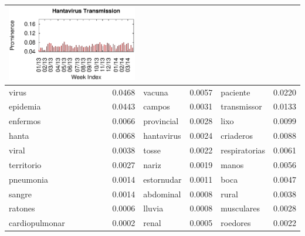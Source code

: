 \documentclass[conference]{IEEEtran}
\begin{document}
\begin{table}[t]
\begin{center}
\begin{tabular}{|lr|lr|lr|}
\multicolumn{2}{|c|}{\includegraphics[clip,scale=0.45]{fig/topic_hanta2_timeline.eps}} \\ \hline
virus & 0.0468 & vacuna & 0.0057 & paciente & 0.0220 \\
epidemia & 0.0443 & campos & 0.0031 & transmissor & 0.0133 \\
enfermos & 0.0066& provincial & 0.0028  & lixo &0.0099 \\
hanta & 0.0068 & hantavirus & 0.0024  & criaderos & 0.0088\\
viral & 0.0038 & tosse & 0.0022 & respiratorias & 0.0061 \\
territorio & 0.0027 & nariz & 0.0019 & manos & 0.0056 \\
pneumonia & 0.0014 & estornudar & 0.0011 & boca & 0.0047 \\
sangre & 0.0014 & abdominal & 0.0008 & rural & 0.0038 \\
ratones & 0.0006 & lluvia & 0.0008 & musculares & 0.0028 \\
cardiopulmonar & 0.0002 & renal & 0.0005 & roedores & 0.0022 \\
\hline
\end{tabular}
\label{tab:hanta_topics}
\end{center}
\vspace{-10pt}
\end{table}
\end{document}
